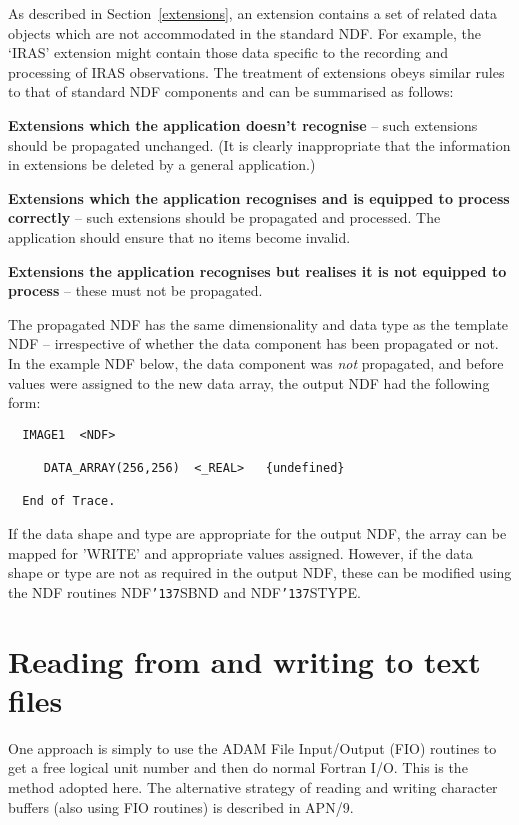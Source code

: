 \documentclass[twoside,11pt]{article}
\renewcommand{\_}{{\tt\char'137}}
\newcommand{\xlabel}[1]{}
\begin{document}
As described in Section~\ref{extensions}, an extension contains a set of 
related data objects which are not accommodated in the standard NDF.
For example, the `IRAS' extension might contain those data specific to
the recording and processing of IRAS observations.
The treatment of extensions obeys similar rules to that of standard 
NDF components and can be summarised as follows:
\begin{description}
\item {\bf Extensions which the application doesn't recognise} -- such 
extensions should be propagated unchanged. 
(It is clearly inappropriate that the information in extensions 
be deleted by a general application.)


\item {\bf Extensions which the application recognises and is equipped to 
process correctly} -- such extensions should be propagated and processed.
The application should ensure that no items become invalid.

\item {\bf Extensions the application recognises but realises it is not 
equipped to process} -- these must not be propagated.
\end{description}

The propagated NDF has the same dimensionality and data type as the 
template NDF -- irrespective of whether the data component has been 
propagated or not.
In the example NDF below, the data component was {\sl not\/} propagated,
and before values were assigned to the new data array, the 
output NDF had the following form:
\begin{verbatim}
  IMAGE1  <NDF>

     DATA_ARRAY(256,256)  <_REAL>   {undefined}

  End of Trace.
\end{verbatim}
If the data shape and type are appropriate for the output NDF, the array
can be mapped for 'WRITE' and appropriate values assigned.
However, if the data shape or type are not as required in 
the output NDF, these can be modified using the NDF routines NDF\_SBND
and NDF\_STYPE.

\newpage
\section{Reading from and writing to text files\label{rddata}\xlabel{reading_from_and_writing_to_text_files}}

One approach is simply to use the ADAM File Input/Output 
(FIO) routines to get a free logical unit number and then do normal Fortran I/O.
This is the method adopted here. The alternative strategy of reading
and writing character buffers (also using FIO routines) is described in APN/9.
\end{document}
